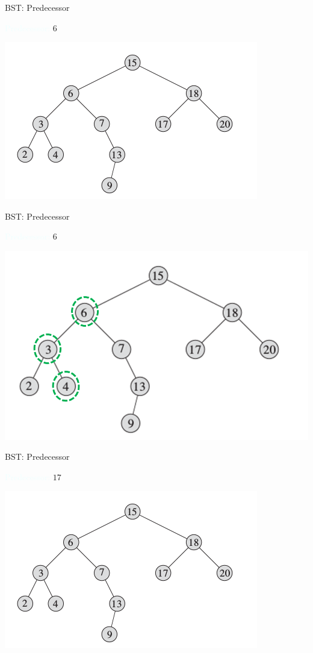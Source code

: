 \documentclass{beamer}
\newcommand{\tblue}[1]{{\Large {\textcolor{azure}{#1}}}}
\begin{document}
\begin{frame}{BST: Predecessor}

\tblue{Predecessor:} $6$
    \begin{center}
        \includegraphics[scale=0.5]{bstSearch.png}
    \end{center}
\end{frame}


\begin{frame}{BST: Predecessor}

\tblue{Predecessor:} $6$
    \begin{center}
        \includegraphics[scale=0.5]{bstPredecessor2.png}
    \end{center}
\end{frame}

\begin{frame}{BST: Predecessor}

\tblue{Predecessor:} $17$
    \begin{center}
        \includegraphics[scale=0.7]{bstSearch.png}
    \end{center}
\end{frame}
\end{document}
